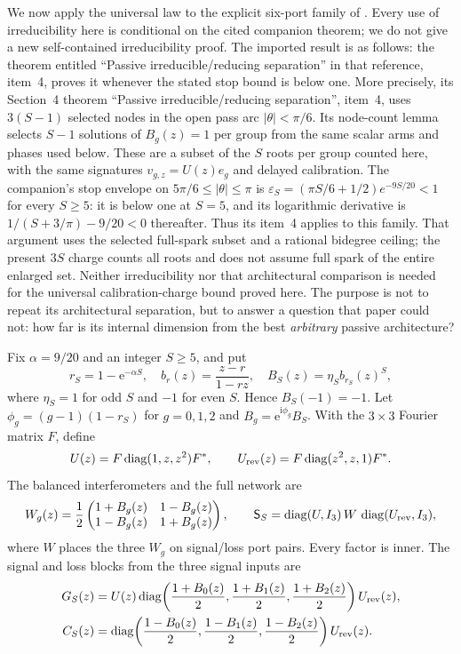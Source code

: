 \documentclass[11pt]{article}
\theoremstyle{definition}
\theoremstyle{remark}
\newcommand{\diag}{\operatorname{diag}}
\newcommand{\e}{\mathrm{e}}
\begin{document}
We now apply the universal law to the explicit six-port family of
\cite{ErikssonReservoir2026}. Every use of irreducibility here is conditional on the cited companion theorem;
we do not give a new self-contained irreducibility proof. The imported result is as follows:
the theorem entitled ``Passive irreducible/reducing separation'' in that
reference, item~4, proves it whenever the stated stop bound is below one.
More precisely, its Section~4 theorem
``Passive irreducible/reducing separation'', item~4, uses $3(S-1)$
selected nodes in the open pass arc $|\theta|<\pi/6$. Its node-count lemma
selects $S-1$ solutions of $B_g(z)=1$ per group from the same scalar arms
and phases used below. These are a subset of the $S$ roots per group counted
here, with the same signatures $v_{g,z}=U(z)e_g$ and delayed calibration.
The companion's stop envelope on $5\pi/6\leq|\theta|\leq\pi$ is
$\varepsilon_S=(\pi S/6+1/2)e^{-9S/20}<1$ for every $S\geq5$:
it is below one at $S=5$, and its logarithmic derivative is
$1/(S+3/\pi)-9/20<0$ thereafter. Thus its item~4 applies to this family.
That argument uses the selected full-spark subset and a rational bidegree
ceiling; the present $3S$ charge counts all roots and does not assume full
spark of the entire enlarged set. Neither irreducibility nor that architectural comparison is
needed for the universal calibration-charge bound proved here.  The purpose is not to repeat its architectural
separation, but to answer a question that paper could not: how far is its
internal dimension from the best \emph{arbitrary} passive architecture?

Fix $\alpha=9/20$ and an integer $S\geq5$, and put
\begin{equation}\label{eq:familyb}
 r_S=1-\e^{-\alpha S},\quad
 b_r(z)=\frac{z-r}{1-rz},\quad
 B_S(z)=\eta_S b_{r_S}(z)^S,
\end{equation}
where $\eta_S=1$ for odd $S$ and $-1$ for even $S$.  Hence $B_S(-1)=-1$.
Let $\phi_g=(g-1)(1-r_S)$ for $g=0,1,2$ and $B_g=\e^{\mathrm{i}\phi_g}B_S$.
With the $3\times3$ Fourier matrix $F$, define
\begin{equation}\label{eq:mixers}
 U(z)=F\diag(1,z,z^2)F^*,\qquad
 U_{\rm rev}(z)=F\diag(z^2,z,1)F^*.
\end{equation}
The balanced interferometers and the full network are
\begin{equation}\label{eq:network}
 W_g(z)=\frac12
 \begin{pmatrix}1+B_g(z)&1-B_g(z)\\1-B_g(z)&1+B_g(z)\end{pmatrix},
 \qquad
 \mathsf S_S=\diag(U,I_3)\,W\,\diag(U_{\rm rev},I_3),
\end{equation}
where $W$ places the three $W_g$ on signal/loss port pairs.  Every factor is
inner.  The signal and loss blocks from the three signal inputs are
\begin{align}
 G_S(z)&=U(z)\diag\!\left(\frac{1+B_0(z)}2,
 \frac{1+B_1(z)}2,\frac{1+B_2(z)}2\right)U_{\rm rev}(z),
 \label{eq:GS}\\
 C_S(z)&=\diag\!\left(\frac{1-B_0(z)}2,
 \frac{1-B_1(z)}2,\frac{1-B_2(z)}2\right)U_{\rm rev}(z).
 \label{eq:CS}
\end{align}
\end{document}
